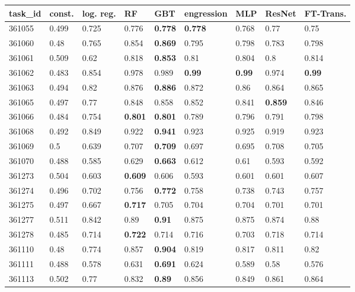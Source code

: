 \begin{table}[ht!]
\centering
\begingroup\footnotesize
\begin{tabular}{lllllllll}
  \hline
\hline
task\_id & const. & log. reg. & RF & GBT & engression & MLP & ResNet & FT-Trans. \\ 
  \hline
361055 & 0.499 & 0.725 & 0.776 & \textbf{0.778} & \textbf{0.778} & 0.768 & 0.77 & 0.75 \\ 
  361060 & 0.48 & 0.765 & 0.854 & \textbf{0.869} & 0.795 & 0.798 & 0.783 & 0.798 \\ 
  361061 & 0.509 & 0.62 & 0.818 & \textbf{0.853} & 0.81 & 0.804 & 0.8 & 0.814 \\ 
  361062 & 0.483 & 0.854 & 0.978 & 0.989 & \textbf{0.99} & \textbf{0.99} & 0.974 & \textbf{0.99} \\ 
  361063 & 0.494 & 0.82 & 0.876 & \textbf{0.886} & 0.872 & 0.86 & 0.864 & 0.865 \\ 
  361065 & 0.497 & 0.77 & 0.848 & 0.858 & 0.852 & 0.841 & \textbf{0.859} & 0.846 \\ 
  361066 & 0.484 & 0.754 & \textbf{0.801} & \textbf{0.801} & 0.789 & 0.796 & 0.791 & 0.798 \\ 
  361068 & 0.492 & 0.849 & 0.922 & \textbf{0.941} & 0.923 & 0.925 & 0.919 & 0.923 \\ 
  361069 & 0.5 & 0.639 & 0.707 & \textbf{0.709} & 0.697 & 0.695 & 0.708 & 0.705 \\ 
  361070 & 0.488 & 0.585 & 0.629 & \textbf{0.663} & 0.612 & 0.61 & 0.593 & 0.592 \\ 
  361273 & 0.504 & 0.603 & \textbf{0.609} & 0.606 & 0.593 & 0.601 & 0.601 & 0.607 \\ 
  361274 & 0.496 & 0.702 & 0.756 & \textbf{0.772} & 0.758 & 0.738 & 0.743 & 0.757 \\ 
  361275 & 0.497 & 0.667 & \textbf{0.717} & 0.705 & 0.704 & 0.704 & 0.701 & 0.701 \\ 
  361277 & 0.511 & 0.842 & 0.89 & \textbf{0.91} & 0.875 & 0.875 & 0.874 & 0.88 \\ 
  361278 & 0.485 & 0.714 & \textbf{0.722} & 0.714 & 0.716 & 0.703 & 0.718 & 0.714 \\ 
  361110 & 0.48 & 0.774 & 0.857 & \textbf{0.904} & 0.819 & 0.817 & 0.811 & 0.82 \\ 
  361111 & 0.488 & 0.578 & 0.631 & \textbf{0.691} & 0.624 & 0.589 & 0.58 & 0.576 \\ 
  361113 & 0.502 & 0.77 & 0.832 & \textbf{0.89} & 0.856 & 0.849 & 0.861 & 0.864 \\ 

\end{tabular}
\end{table}
